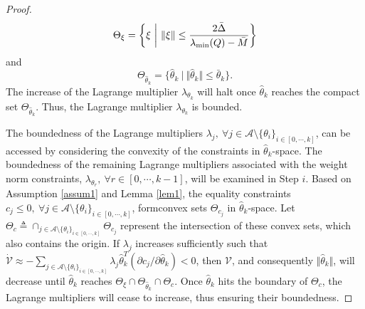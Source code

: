 \documentclass[lettersize,journal]{IEEEtran}
\begin{document}
\begin{proof}
\begin{equation}
    \Theta_\xi = 
    \bigg\{ \xi \ \bigg\vert\ \Vert\xi\Vert \le  
    {2\bar \Delta\over \lambda _\text{min}(Q)-\bar M} 
    \bigg\}
\end{equation}
and
\begin{equation}\label{eq: hat theta k bnd}
    \Theta_{\hat\theta_k} = 
    \{
    \hat\theta_k 
    \ 
    \vert
    \ 
    \Vert
    \hat\theta_k\Vert \le  
    \bar\theta_k
    \}
    .
\end{equation}
The increase of the Lagrange multiplier $\lambda_{\theta_k}$ will halt once $\hat \theta_k$ reaches the compact set $\Theta_{\hat\theta_k}$. Thus, the Lagrange multiplier $\lambda_{\theta_k}$ is bounded.





The boundedness of the Lagrange multipliers $\lambda_j,\ \forall j\in\mathcal A\setminus\{\theta_i\}_{i\in[0,\cdots,k]}$, can be accessed by considering the convexity of the constraints in $\hat\theta_k$-space.
The boundedness of the remaining Lagrange multipliers associated with the weight norm constraints, $\lambda_{\theta_r},\ \forall r\in[0,\cdots,k-1]$, will be examined in Step $i$. Based on Assumption \ref{assum1} and Lemma \ref{lem1},  
the equality constraints $c_j \le 0, \ \forall j\in\mathcal A\setminus \{\theta_i\}_{i\in[0,\cdots,k]}$, formconvex sets $\Theta_{c_j}$ in $\hat\theta_k$-space.
Let $\Theta_c\triangleq \cap_{j\in\mathcal A\setminus \{\theta_i\}_{i\in[0,\cdots ,k]}} \Theta_{c_j}$ represent the intersection of these convex sets, which also contains the origin.
If $\lambda_j$ increases sufficiently such that $\dot{\mathcal V} \approx -\sum_{j\in\mathcal A\setminus \{\theta_i\}_{i\in[0,\cdots,k]}}\lambda_j\hat\theta_k^T(\partial c_j/\partial \hat\theta_k)<0$, then ${\mathcal V}$, and consequently $\Vert\hat\theta_k\Vert$, will decrease until $\hat\theta_k$ reaches $\Theta_\xi\cap\Theta_{\hat\theta_k}\cap\Theta_c$. Once $\hat\theta_k$ hits the boundary of $\Theta_c$, the Lagrange multipliers will cease to increase, thus ensuring their boundedness.


\end{proof}
\end{document}
